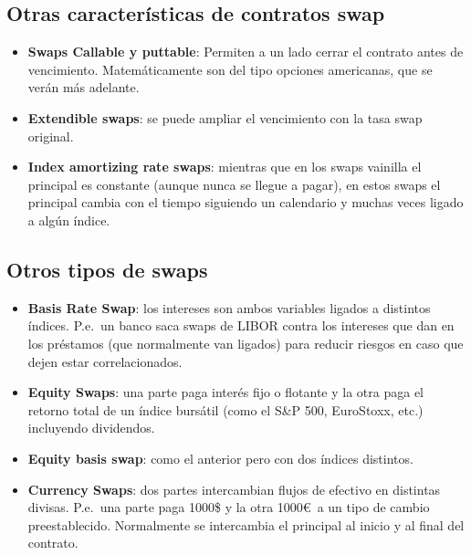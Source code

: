 \subsection{Otras características de contratos swap}
\begin{itemize}
    \item \textbf{Swaps Callable y puttable}: Permiten a un lado cerrar el contrato antes de vencimiento. Matemáticamente son del tipo opciones americanas, que se verán más adelante. 
    \item \textbf{Extendible swaps}: se puede ampliar el vencimiento con la tasa swap original.
    \item \textbf{Index amortizing rate swaps}: mientras que en los swaps vainilla el principal es constante (aunque nunca se llegue a pagar), en estos swaps el principal cambia con el tiempo siguiendo un calendario y muchas veces ligado a algún índice.
\end{itemize}





\subsection{Otros tipos de swaps}
\begin{itemize}
    \item \textbf{Basis Rate Swap}: los intereses son ambos variables ligados a distintos índices. P.e.\ un banco saca swaps de LIBOR contra los intereses que dan en los préstamos (que normalmente van ligados) para reducir riesgos en caso que dejen estar correlacionados.
    \item \textbf{Equity Swaps}: una parte paga interés fijo o flotante y la otra paga el retorno total de un índice bursátil (como el S\&P 500, EuroStoxx, etc.) incluyendo dividendos.
    \item \textbf{Equity basis swap}: como el anterior pero con dos índices distintos.
    \item \textbf{Currency Swaps}: dos partes intercambian flujos de efectivo en distintas divisas. P.e.\ una parte paga 1000\$ y la otra 1000\euro\ a un tipo de cambio preestablecido. Normalmente se intercambia el principal al inicio y al final del contrato.
\end{itemize}







